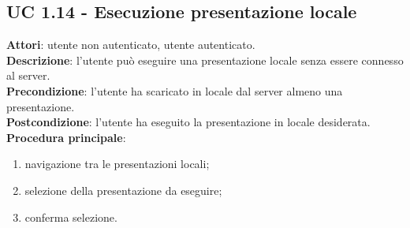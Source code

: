 \subsection{UC 1.14 - Esecuzione presentazione locale}{
\label{uc1.14}
	\textbf{Attori}: utente non autenticato, utente autenticato.\\
	\textbf{Descrizione}: l'utente può eseguire una presentazione locale senza essere connesso al server.\\
	\textbf{Precondizione}: l'utente ha scaricato in locale dal server almeno una presentazione.\\
	\textbf{Postcondizione}: l'utente ha eseguito la presentazione in locale desiderata.\\
	\textbf{Procedura principale}:
	\begin{enumerate}
		\item navigazione tra le presentazioni locali;
		\item selezione della presentazione da eseguire;
		\item conferma selezione.
	\end{enumerate}
}